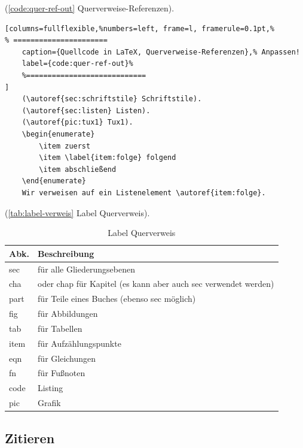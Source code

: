 (\autoref{code:quer-ref-out} Querverweise-Referenzen).%
\lstset{language=[LaTeX]TeX} %
\begin{lstlisting}[columns=fullflexible,%numbers=left, frame=l, framerule=0.1pt,%
% ======================
	caption={Quellcode in LaTeX, Querverweise-Referenzen},% Anpassen!
	label={code:quer-ref-out}%
	%============================
]
	(\autoref{sec:schriftstile} Schriftstile).
	(\autoref{sec:listen} Listen).
	(\autoref{pic:tux1} Tux1).
	\begin{enumerate}
		\item zuerst
		\item \label{item:folge} folgend
		\item abschließend
	\end{enumerate}
	Wir verweisen auf ein Listenelement \autoref{item:folge}.
\end{lstlisting}

(\autoref{tab:label-verweis} Label Querverweis).
\begin{table}[!hb] %
	\caption{Label Querverweis }	%
  \label{tab:label-verweis}	%
	\centering
	\begin{tabular} {ll}
	\toprule %
		Abk. & Beschreibung \\
  \midrule
		sec  & für alle Gliederungsebenen \\
		cha  & oder chap für Kapitel (es kann aber auch sec verwendet werden) \\
		part & für Teile eines Buches (ebenso sec möglich) \\
		fig  & für Abbildungen \\
		tab  & für Tabellen \\
		item & für Aufzählungspunkte \\
		eqn  & für Gleichungen  \\
		fn   & für Fußnoten \\
		code & Listing \\
		pic  & Grafik \\
	\bottomrule
	\end{tabular}
\end{table}

\newpage

\subsection{Zitieren}\label{sec:zitieren}

